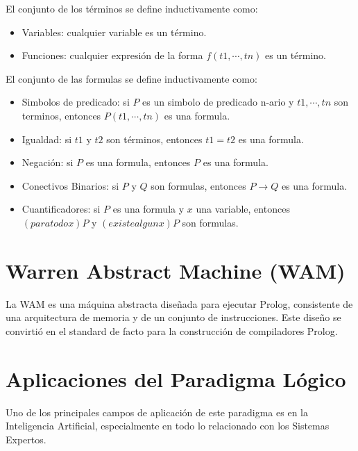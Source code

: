 \documentclass[12pt,titlepage]{article}
\begin{document}
El conjunto de los términos se define inductivamente como: \\
\begin{itemize}
    \item Variables: cualquier variable es un término.
    \item Funciones: cualquier expresión de la forma $f(t1,\cdots,tn)$ es un término.
\end{itemize}
El conjunto de las formulas se define inductivamente como: \\
\begin{itemize}
    \item Simbolos de predicado: si $P$ es un simbolo de predicado n-ario y $t1,\cdots,tn$ son terminos, entonces $P(t1,\cdots,tn)$ es una formula.
    \item Igualdad: si $t1$ y $t2$ son términos, entonces $t1=t2$ es una formula.
    \item Negación: si $P$ es una formula, entonces $P$ es una formula. %
    \item Conectivos Binarios: si $P$ y $Q$ son formulas, entonces $P \rightarrow Q$ es una formula. %
    \item Cuantificadores: si $P$ es una formula y $x$ una variable, entonces $(para todo x)P$ y $(existe algun x)P$ son formulas. %
\end{itemize}

\newpage

\section{Warren Abstract Machine (WAM)}

La WAM es una máquina abstracta diseñada para ejecutar Prolog, consistente de una arquitectura de memoria y de un conjunto de instrucciones. Este diseño se convirtió en el standard de facto para la construcción de compiladores Prolog. \\

\newpage

\section{Aplicaciones del Paradigma Lógico}

Uno de los principales campos de aplicación de este paradigma es en la Inteligencia Artificial, especialmente en todo lo relacionado con los Sistemas Expertos. \\
\end{document}
